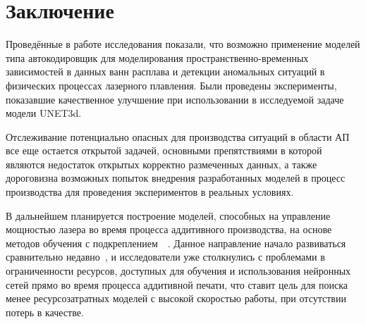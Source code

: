 \documentclass{article}
\begin{document}

\section{Заключение}
    Проведённые в работе исследования показали, что возможно применение моделей типа автокодировщик для моделирования пространственно-временных зависимостей в данных ванн расплава и детекции аномальных ситуаций в физических процессах лазерного плавления. Были проведены эксперименты, показавшие качественное улучшение при использовании в исследуемой задаче модели UNET3d.
    
    Отслеживание потенциально опасных для производства ситуаций в области АП все еще остается открытой задачей, основными препятствиями в которой являются недостаток открытых корректно размеченных данных, а также дороговизна возможных попыток внедрения разработанных моделей в процесс производства для проведения экспериментов в реальных условиях.

    В дальнейшем планируется построение моделей, способных на управление мощностью лазера во время процесса аддитивного производства, на основе методов обучения с подкреплением~\cite{rl_review}~\cite{kaelbling1996reinforcement}. Данное направление начало развиваться сравнительно недавно~\cite{rl_AP_1}, и исследователи уже столкнулись с проблемами в ограниченности ресурсов, доступных для обучения и использования нейронных сетей прямо во время процесса аддитивной печати, что ставит цель для поиска менее ресурсозатратных моделей с высокой скоростью работы, при отсутствии потерь в качестве. 
    





\newpage
\appendix
{}
\renewcommand{\thesubsection}{\Alph{subsection}}
\end{document}
